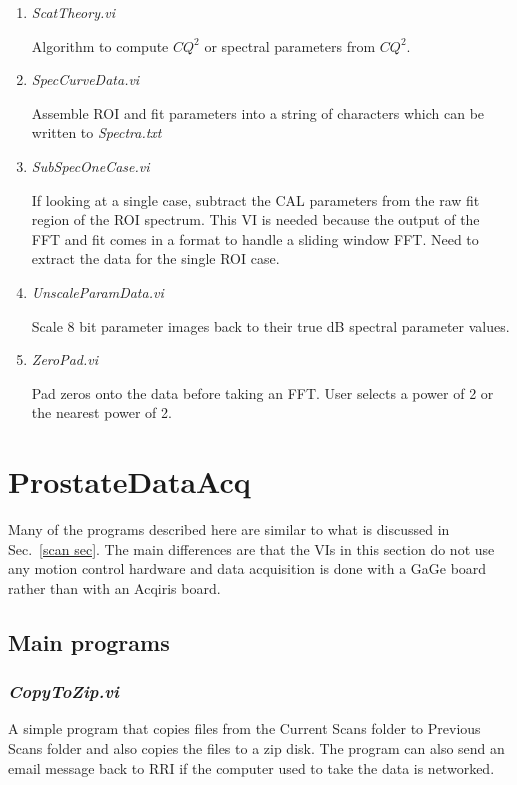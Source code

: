 \documentclass[10pt]{article}
\begin{document}
\begin{enumerate}
\item{{\it ScatTheory.vi}}

Algorithm to compute $CQ^{2}$ or spectral parameters from
$CQ^{2}$.

\item {\it SpecCurveData.vi}

Assemble ROI and fit parameters into a string of characters which
can be written to {\it Spectra.txt}

\item {\it SubSpecOneCase.vi}

If looking at a single case, subtract the CAL parameters from the
raw fit region of the ROI spectrum. This VI is needed because the
output of the FFT and fit comes in a format to handle a sliding
window FFT. Need to extract the data for the single ROI case.

\item {\it UnscaleParamData.vi}

Scale 8 bit parameter images back to their true dB spectral
parameter values.

\item {\it ZeroPad.vi}

Pad zeros onto the data before taking an FFT. User selects a power
of 2 or the nearest power of 2.

\end{enumerate}

\section{ProstateDataAcq}
Many of the programs described here are similar to what is
discussed in Sec.~\ref{scan sec}. The main differences are that
the VIs in this section do not use any motion control hardware and
data acquisition is done with a GaGe board rather than with an
Acqiris board.

\subsection{Main programs}
\subsubsection{{\it CopyToZip.vi}}
A simple program that copies files from the Current Scans folder
to Previous Scans folder and also copies the files to a zip disk.
The program can also send an email message back to RRI if the
computer used to take the data is networked.
\end{document}
